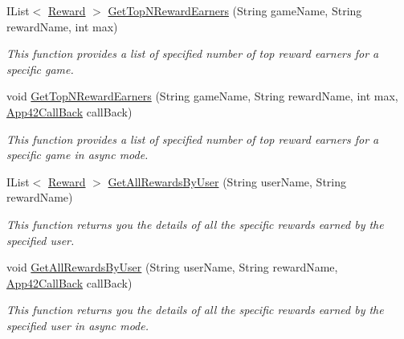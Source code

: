 \begin{DoxyCompactItemize}
I\+List$<$ \hyperlink{classcom_1_1shephertz_1_1app42_1_1paas_1_1sdk_1_1csharp_1_1reward_1_1_reward}{Reward} $>$ \hyperlink{classcom_1_1shephertz_1_1app42_1_1paas_1_1sdk_1_1csharp_1_1reward_1_1_reward_service_ab0c3d1dbeef1b33c07aee1add812d707}{Get\+Top\+N\+Reward\+Earners} (String game\+Name, String reward\+Name, int max)
\begin{DoxyCompactList}\small\item\em This function provides a list of specified number of top reward earners for a specific game. \end{DoxyCompactList}\item 
void \hyperlink{classcom_1_1shephertz_1_1app42_1_1paas_1_1sdk_1_1csharp_1_1reward_1_1_reward_service_a3d03aee8b12ab79056a77e6917c5177a}{Get\+Top\+N\+Reward\+Earners} (String game\+Name, String reward\+Name, int max, \hyperlink{interfacecom_1_1shephertz_1_1app42_1_1paas_1_1sdk_1_1csharp_1_1_app42_call_back}{App42\+Call\+Back} call\+Back)
\begin{DoxyCompactList}\small\item\em This function provides a list of specified number of top reward earners for a specific game in async mode. \end{DoxyCompactList}\item 
I\+List$<$ \hyperlink{classcom_1_1shephertz_1_1app42_1_1paas_1_1sdk_1_1csharp_1_1reward_1_1_reward}{Reward} $>$ \hyperlink{classcom_1_1shephertz_1_1app42_1_1paas_1_1sdk_1_1csharp_1_1reward_1_1_reward_service_a84938bcb7196ede478ba921bdbbeeeea}{Get\+All\+Rewards\+By\+User} (String user\+Name, String reward\+Name)
\begin{DoxyCompactList}\small\item\em This function returns you the details of all the specific rewards earned by the specified user. \end{DoxyCompactList}\item 
void \hyperlink{classcom_1_1shephertz_1_1app42_1_1paas_1_1sdk_1_1csharp_1_1reward_1_1_reward_service_a87cebe91cbcd68538e51bfc3c148b41a}{Get\+All\+Rewards\+By\+User} (String user\+Name, String reward\+Name, \hyperlink{interfacecom_1_1shephertz_1_1app42_1_1paas_1_1sdk_1_1csharp_1_1_app42_call_back}{App42\+Call\+Back} call\+Back)
\begin{DoxyCompactList}\small\item\em This function returns you the details of all the specific rewards earned by the specified user in async mode. \end{DoxyCompactList}\item 

\end{DoxyCompactItemize}
